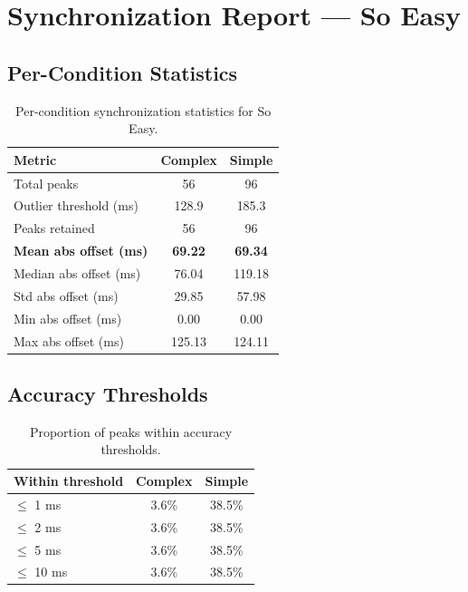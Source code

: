 
\section*{Synchronization Report --- So Easy}

\subsection*{Per-Condition Statistics}

\begin{table}[h!]
\centering
\begin{tabular}{|l|c|c|}
\hline
Metric & Complex & Simple \\
\hline
Total peaks & 56 & 96 \\
Outlier threshold (ms) & 128.9 & 185.3 \\
Peaks retained & 56 & 96 \\
\textbf{Mean abs offset (ms)} & \textbf{69.22} & \textbf{69.34} \\
Median abs offset (ms) & 76.04 & 119.18 \\
Std abs offset (ms) & 29.85 & 57.98 \\
Min abs offset (ms) & 0.00 & 0.00 \\
Max abs offset (ms) & 125.13 & 124.11 \\
\hline
\end{tabular}
\caption{Per-condition synchronization statistics for So Easy.}
\label{tab:sync_stats}
\end{table}

\subsection*{Accuracy Thresholds}

\begin{table}[h!]
\centering
\begin{tabular}{|l|c|c|}
\hline
Within threshold & Complex & Simple \\
\hline
$\leq$ 1 ms & 3.6\% & 38.5\% \\
$\leq$ 2 ms & 3.6\% & 38.5\% \\
$\leq$ 5 ms & 3.6\% & 38.5\% \\
$\leq$ 10 ms & 3.6\% & 38.5\% \\
\hline
\end{tabular}
\caption{Proportion of peaks within accuracy thresholds.}
\label{tab:sync_accuracy}
\end{table}

